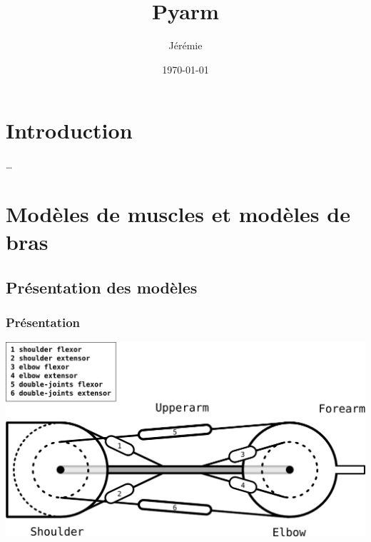 \documentclass[pdftex,a4paper,11pt]{report}
\numberwithin{equation}{subsection}
\begin{document}
\title{Pyarm}
\author{
	Jérémie 
}
\date{\today{}}

\maketitle


\tableofcontents


\chapter*{Introduction}

\dots


\chapter{Modèles de muscles et modèles de bras}

\section{Présentation des modèles}

\subsection{Présentation}

\begin{center}
        \includegraphics[width=.90\linewidth]{fig/muscle4c}
\end{center}
\end{document}
